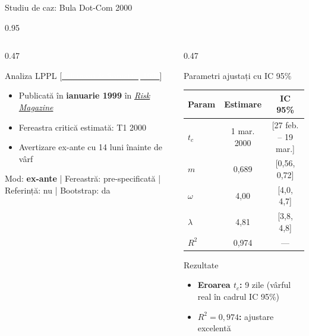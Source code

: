 \documentclass[9pt, aspectratio=169, t]{beamer}
\begin{document}
\begin{frame}{Studiu de caz: Bula Dot-Com 2000}
\begin{cminipage}{0.95\textwidth}
{\begin{columns}[T]
\begin{column}{0.47\textwidth}
            \begin{exampleblock}{Analiza LPPL {\scriptsize[\href{https://doi.org/10.48550/arXiv.cond-mat/9903321}{\textcolor{white}{Johansen \& Sornette, 1999}}]}}
                \begin{itemize}\setlength{\itemsep}{0pt}
                    \item Publicată în \textbf{ianuarie 1999} în \href{https://www.risk.net}{\textit{Risk Magazine}}
                    \item Fereastra critică estimată: T1 2000
                    \item Avertizare ex-ante cu 14 luni înainte de vârf
                \end{itemize}
            \end{exampleblock}
            \vspace{-2mm}
            {\scriptsize\textcolor{MediumGray}{Mod: \textbf{ex-ante} | Fereastră: pre-specificată | Referință: nu | Bootstrap: da}}
        \end{column}
        \begin{column}{0.47\textwidth}
            \begin{alertblock}{Parametri ajustați cu IC 95\%}
                \begin{center}
                    \begin{tabular}{lcc}
                        \toprule
                        \textbf{Param} & \textbf{Estimare} & \textbf{IC 95\%} \\
                        \midrule
                        $t_c$ & 1 mar. 2000 & [27 feb. -- 19 mar.] \\
                        $m$ & 0,689 & [0,56, 0,72] \\
                        $\omega$ & 4,00 & [4,0, 4,7] \\
                        $\lambda$ & 4,81 & [3,8, 4,8] \\
                        $R^2$ & 0,974 & --- \\
                        \bottomrule
                    \end{tabular}
                \end{center}
            \end{alertblock}

            \begin{exampleblock}{Rezultate}
                \begin{itemize}\setlength{\itemsep}{0pt}
                    \item \textbf{Eroarea $t_c$:} 9 zile (vârful real în cadrul IC 95\%)
                    \item \textbf{$R^2 = 0{,}974$:} ajustare excelentă
                \end{itemize}
            \end{exampleblock}
        \end{column}
    \end{columns}
    }
    \end{cminipage}
\end{frame}
\end{document}
